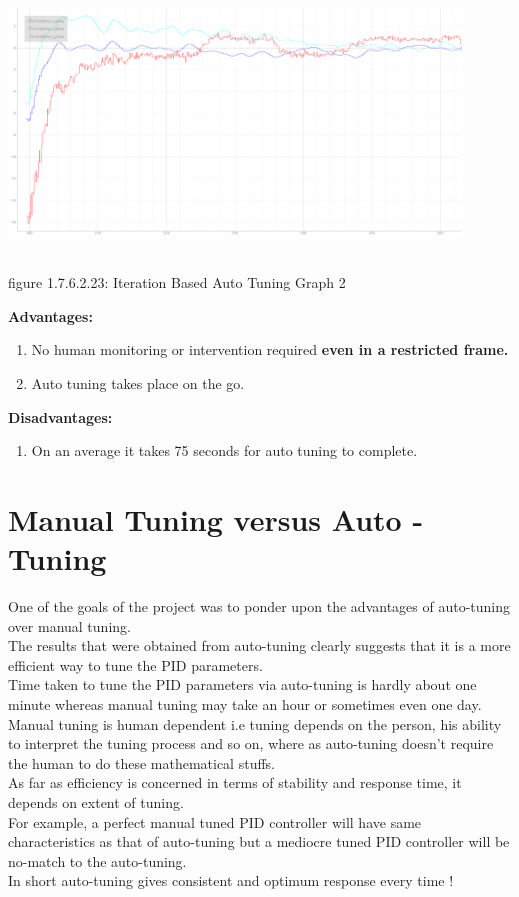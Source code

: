 \documentclass[a4paper,12pt,oneside]{book}
\begin{document}
\begin{enumerate}
\includegraphics[width = 12cm , height= 7cm]{Autotune_iteration_2.png}
\begin{center}
    figure 1.7.6.2.23: Iteration Based Auto Tuning Graph 2
\end{center}
\end{enumerate}
\textbf{Advantages:}\vspace{1em}
            \begin{enumerate}
                \item No human monitoring or intervention required \textbf{even in a restricted frame.}
                \item Auto tuning takes place on the go.
            \end{enumerate}
            
            
            \textbf{Disadvantages:}
            
            
            \begin{enumerate}
                \item On an average it takes 75 seconds for auto tuning to complete.
            \end{enumerate}

\pagebreak
\section{Manual Tuning versus Auto - Tuning }
One of the goals of the project was to ponder upon the advantages of auto-tuning over manual tuning.\\
The results that were obtained from auto-tuning clearly suggests that it is a more efficient way to tune the PID parameters.\\
Time taken to tune the PID parameters via auto-tuning is hardly about one minute whereas manual tuning may take an hour or sometimes even one day.\\
Manual tuning is human dependent i.e tuning depends on the person, his ability to interpret the tuning process and so on, where as auto-tuning doesn't require the human to do these mathematical stuffs.\\
As far as efficiency is concerned in terms of stability and response time, it depends on extent of tuning.\\
For example, a perfect manual tuned PID controller will have same characteristics as that of auto-tuning but a mediocre tuned PID controller will be no-match to the auto-tuning.\\
In short auto-tuning gives consistent and optimum response every time !
\end{document}
